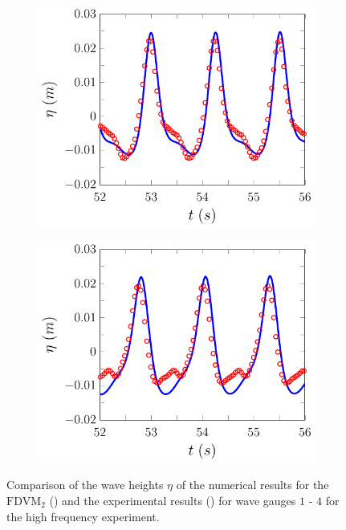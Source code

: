 \begin{figure}
	\begin{subfigure}{0.5\textwidth}
		\includegraphics[width=\textwidth]{./chp6/figures/Experiment/Beji/sh/FDVMWG3.pdf}
		\vspace{0.5cm}
	\end{subfigure}%
	\begin{subfigure}{0.5\textwidth}
		\includegraphics[width=\textwidth]{./chp6/figures/Experiment/Beji/sh/FDVMWG4.pdf}
		\vspace{0.5cm}
	\end{subfigure}
	\caption{Comparison of the wave heights $\eta$ of the numerical results for the $\text{FDVM}_2$ ({\color{blue}\solidrule}) and the experimental results () for wave gauges $1$ - $4$ for the high frequency experiment.}
	\label{fig:BejishWG1to4FDVM}
\end{figure}

